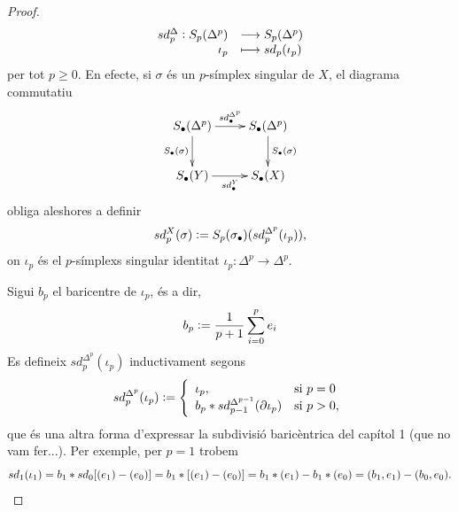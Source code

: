 \documentclass[../main.tex]{subfiles}
\begin{document}
\begin{enumerate}
\begin{proof}
    \begin{equation}
        \notag
        \begin{array}{rl}
            sd_p^\Delta: S_p(\Delta^p)& \longrightarrow S_p(\Delta^p) \\
            \iota_p & \longmapsto sd_p(\iota_p)
        \end{array}
    \end{equation}
    per tot $p\geq 0$. En efecte, si $\sigma$ és un $p$-símplex singular de $X$, el diagrama commutatiu
    \begin{equation}
        \notag
        \xymatrix{
        S_\bullet(\Delta^p)\ar[r]^{sd_\bullet^{\Delta^p}}\ar[d]_{S_\bullet(\sigma)} & S_\bullet(\Delta^p)\ar[d]^{S_\bullet(\sigma)} \\
        S_\bullet(Y)\ar[r]_{sd_\bullet^Y} & S_\bullet(X)
        }
    \end{equation}
    obliga aleshores a definir
    \begin{equation}
        \notag
        sd_p^X(\sigma):= S_p(\sigma_\bullet)(sd_p^{\Delta^p}(\iota_p)),
    \end{equation}
    on $\iota_p$ és el $p$-símplexs singular identitat $\iota_p:\Delta^p\rightarrow\Delta^p$.
    
    Sigui $b_p$ el baricentre de $\iota_p$, és a dir,
    \begin{equation}
        \notag
        b_p:=\frac{1}{p+1}\sum_{i=0}^p e_i
    \end{equation}
    Es defineix $sd_p^{\Delta^p}(\iota_p)$ inductivament segons
    \begin{equation}
        \notag
        sd_p^{\Delta^p}(\iota_p) := \left\{
        \begin{array}{ll}
            \iota_p, & \text{si $p = 0$}\\
            b_p*sd_{p-1}^{\Delta^{p-1}}(\partial\iota_p) & \text{si $p>0$},    
        \end{array}
        \right.
    \end{equation}
    que és una altra forma d'expressar la subdivisió baricèntrica del capítol 1 (que no vam fer...). Per exemple, per $p = 1$ trobem
    \begin{equation}
        \notag
        sd_1(\iota_1) = b_1*sd_0[(e_1)-(e_0)] = b_1*[(e_1)-(e_0)] = b_1*(e_1)-b_1*(e_0) = (b_1,e_1)-(b_0,e_0).
    \end{equation}
    

\end{proof}
\end{enumerate}
\end{document}
